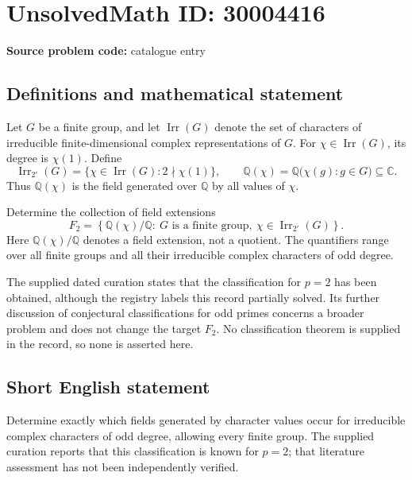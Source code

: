 \documentclass[11pt]{article}
\newcommand{\Q}{\mathbb{Q}}
\newcommand{\C}{\mathbb{C}}
\begin{document}
\section*{UnsolvedMath ID: 30004416}
\textbf{Source problem code:} catalogue entry
\subsection{Definitions and mathematical statement}
Let \(G\) be a finite group, and let \(\operatorname{Irr}(G)\) denote the set of characters of irreducible finite-dimensional complex representations of \(G\). For \(\chi\in\operatorname{Irr}(G)\), its degree is \(\chi(1)\). Define
\[
\operatorname{Irr}_{2'}(G)=\{\chi\in\operatorname{Irr}(G):2\nmid\chi(1)\},
\qquad
\Q(\chi)=\Q\bigl(\chi(g):g\in G\bigr)\subseteq\C.
\]
Thus \(\Q(\chi)\) is the field generated over \(\Q\) by all values of \(\chi\).

Determine the collection of field extensions
\[
F_2=\left\{\Q(\chi)/\Q:\ G\text{ is a finite group},\ \chi\in\operatorname{Irr}_{2'}(G)\right\}.
\]
Here \(\Q(\chi)/\Q\) denotes a field extension, not a quotient. The quantifiers range over all finite groups and all their irreducible complex characters of odd degree.

The supplied dated curation states that the classification for \(p=2\) has been obtained, although the registry labels this record partially solved. Its further discussion of conjectural classifications for odd primes concerns a broader problem and does not change the target \(F_2\). No classification theorem is supplied in the record, so none is asserted here.
\subsection{Short English statement}
Determine exactly which fields generated by character values occur for irreducible complex characters of odd degree, allowing every finite group. The supplied curation reports that this classification is known for \(p=2\); that literature assessment has not been independently verified.
\end{document}
